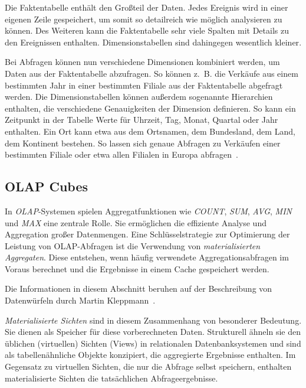 Die Faktentabelle enthält den Großteil der Daten.
Jedes Ereignis wird in einer eigenen Zeile gespeichert, um somit so detailreich wie möglich analysieren zu können.
Des Weiteren kann die Faktentabelle sehr viele Spalten mit Details zu den Ereignissen enthalten.
Dimensionstabellen sind dahingegen wesentlich kleiner\cite[S.~101-103]{kleppmann_datenintensive_2019}.

Bei Abfragen können nun verschiedene Dimensionen kombiniert werden, um Daten aus der Faktentabelle abzufragen.
So können z.~B. die Verkäufe aus einem bestimmten Jahr in einer bestimmten Filiale aus der Faktentabelle abgefragt werden.
Die Dimensionstabellen können außerdem sogenannte Hierarchien enthalten, die verschiedene Genauigkeiten der Dimension definieren.
So kann ein Zeitpunkt in der Tabelle Werte für Uhrzeit, Tag, Monat, Quartal oder Jahr enthalten.
Ein Ort kann etwa aus dem Ortsnamen, dem Bundesland, dem Land, dem Kontinent bestehen.
So lassen sich genaue Abfragen zu Verkäufen einer bestimmten Filiale oder etwa allen Filialen in Europa abfragen~\cite[S.~5]{vaisman_data_2022}.

\subsection{OLAP Cubes}
In \emph{OLAP}-Systemen spielen Aggregatfunktionen wie \emph{COUNT}, \emph{SUM}, \emph{AVG}, \emph{MIN} und \emph{MAX} eine zentrale Rolle. Sie ermöglichen die effiziente Analyse und Aggregation großer Datenmengen. Eine Schlüsselstrategie zur Optimierung der Leistung von OLAP-Abfragen ist die Verwendung von \emph{materialisierten Aggregaten}. Diese entstehen, wenn häufig verwendete Aggregationsabfragen im Voraus berechnet und die Ergebnisse in einem Cache gespeichert werden.

Die Informationen in diesem Abschnitt beruhen auf der Beschreibung von Datenwürfeln durch Martin Kleppmann~\cite[S.~109-111]{kleppmann_datenintensive_2019}.

\emph{Materialisierte Sichten} sind in diesem Zusammenhang von besonderer Bedeutung. Sie dienen als Speicher für diese vorberechneten Daten. Strukturell ähneln sie den üblichen (virtuellen) Sichten (Views) in relationalen Datenbanksystemen und sind als tabellenähnliche Objekte konzipiert, die aggregierte Ergebnisse enthalten. Im Gegensatz zu virtuellen Sichten, die nur die Abfrage selbst speichern, enthalten materialisierte Sichten die tatsächlichen Abfrageergebnisse.

